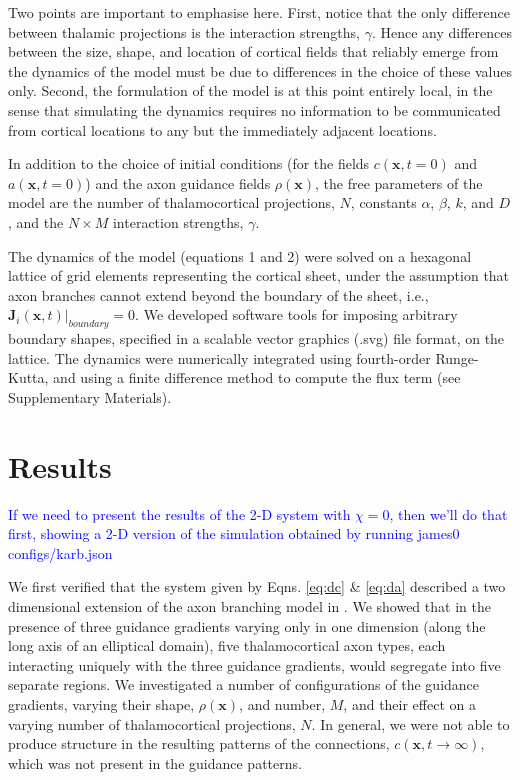 \documentclass[a4paper,11pt]{article}
\newcommand{\cmnt}[1]{\textcolor{blue}{#1}}
\newcommand{\code}[1]{\textsf{#1}}
\newcommand{\mb}[1]{\mathbf{#1}}
\begin{document}
Two points are important to emphasise here. First, notice that the only
difference between thalamic projections is the interaction strengths,
$\gamma$. Hence any differences between the size, shape, and location of
cortical fields that reliably emerge from the dynamics of the model must be
due to differences in the choice of these values only. Second, the formulation
of the model is at this point entirely local, in the sense that simulating the
dynamics requires no information to be communicated from cortical locations to
any but the immediately adjacent locations.

In addition to the choice of initial conditions (for the fields
$c(\mb{x},t=0)$ and $a(\mb{x},t=0)$) and the axon guidance fields
$\rho(\mb{x})$, the free parameters of the model are the number of
thalamocortical projections, $N$, constants $\alpha$, $\beta$, $k$, and $D$,
and the $N\times M$ interaction strengths, $\gamma$.

The dynamics of the model (equations 1 and 2) were solved on a hexagonal
lattice of grid elements representing the cortical sheet, under the assumption
that axon branches cannot extend beyond the boundary of the sheet, i.e.,
$\mb{J}_i(\mb{x},t) \bigg\rvert_{boundary} = 0$. We developed software tools
for imposing arbitrary boundary shapes, specified in a scalable vector
graphics (.svg) file format, on the lattice. The dynamics were numerically
integrated using fourth-order Runge-Kutta, and using a {\color{red} finite
  difference method} to compute the flux term (see Supplementary Materials).

\section*{Results}

\cmnt{If we need to present the results of the 2-D system with $\chi=0$, then
  we'll do that first, showing a 2-D version of the simulation obtained by
  running \code{james0 configs/karb.json}}

We first verified that the system given by Eqns. \ref{eq:dc} \&
\ref{eq:da} described a two dimensional extension of the axon
branching model in \citet{Karbowski2004}. We showed that in the presence of
three guidance gradients varying only in one dimension (along the long axis of
an elliptical domain), five thalamocortical axon types, each interacting
uniquely with the three guidance gradients, would segregate into five separate
regions. We investigated a number of configurations of the guidance gradients,
varying their shape, $\rho(\mb{x})$, and number, $M$, and their effect on a
varying number of thalamocortical projections, $N$. In general, we were not
able to produce structure in the resulting patterns of the connections,
$c(\mb{x},t\rightarrow\infty)$, which was not present in the guidance
patterns.
\end{document}
